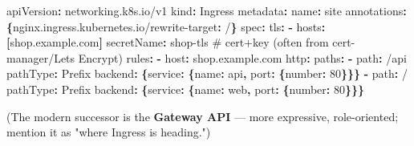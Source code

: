 \documentclass[11pt]{article}
\newenvironment{Shaded}{\begin{snugshade}}{\end{snugshade}}
\newcommand{\AttributeTok}[1]{\textcolor[rgb]{0.16,0.50,0.73}{#1}}
\newcommand{\CommentTok}[1]{\textcolor[rgb]{0.48,0.49,0.49}{#1}}
\newcommand{\DecValTok}[1]{\textcolor[rgb]{0.96,0.45,0.00}{#1}}
\newcommand{\FunctionTok}[1]{\textcolor[rgb]{0.56,0.27,0.68}{#1}}
\newcommand{\KeywordTok}[1]{\textcolor[rgb]{0.81,0.81,0.76}{\textbf{#1}}}
\begin{document}
\begin{Shaded}
\begin{Highlighting}[]
\FunctionTok{apiVersion}\KeywordTok{:}\AttributeTok{ networking.k8s.io/v1}
\FunctionTok{kind}\KeywordTok{:}\AttributeTok{ Ingress}
\FunctionTok{metadata}\KeywordTok{:}
\AttributeTok{  }\FunctionTok{name}\KeywordTok{:}\AttributeTok{ site}
\AttributeTok{  }\FunctionTok{annotations}\KeywordTok{:}\AttributeTok{ }\KeywordTok{\{}\FunctionTok{nginx.ingress.kubernetes.io/rewrite{-}target}\KeywordTok{:}\AttributeTok{ /}\KeywordTok{\}}
\FunctionTok{spec}\KeywordTok{:}
\AttributeTok{  }\FunctionTok{tls}\KeywordTok{:}
\AttributeTok{    }\KeywordTok{{-}}\AttributeTok{ }\FunctionTok{hosts}\KeywordTok{:}\AttributeTok{ }\KeywordTok{[}\AttributeTok{shop.example.com}\KeywordTok{]}
\AttributeTok{      }\FunctionTok{secretName}\KeywordTok{:}\AttributeTok{ shop{-}tls}\CommentTok{         \# cert+key (often from cert{-}manager/Let\textquotesingle{}s Encrypt)}
\AttributeTok{  }\FunctionTok{rules}\KeywordTok{:}
\AttributeTok{    }\KeywordTok{{-}}\AttributeTok{ }\FunctionTok{host}\KeywordTok{:}\AttributeTok{ shop.example.com}
\AttributeTok{      }\FunctionTok{http}\KeywordTok{:}
\AttributeTok{        }\FunctionTok{paths}\KeywordTok{:}
\AttributeTok{          }\KeywordTok{{-}}\AttributeTok{ }\FunctionTok{path}\KeywordTok{:}\AttributeTok{ /api}
\AttributeTok{            }\FunctionTok{pathType}\KeywordTok{:}\AttributeTok{ Prefix}
\AttributeTok{            }\FunctionTok{backend}\KeywordTok{:}\AttributeTok{ }\KeywordTok{\{}\FunctionTok{service}\KeywordTok{:}\AttributeTok{ }\KeywordTok{\{}\FunctionTok{name}\KeywordTok{:}\AttributeTok{ api}\KeywordTok{,}\AttributeTok{   }\FunctionTok{port}\KeywordTok{:}\AttributeTok{ }\KeywordTok{\{}\FunctionTok{number}\KeywordTok{:}\AttributeTok{ }\DecValTok{80}\KeywordTok{\}\}\}}
\AttributeTok{          }\KeywordTok{{-}}\AttributeTok{ }\FunctionTok{path}\KeywordTok{:}\AttributeTok{ /}
\AttributeTok{            }\FunctionTok{pathType}\KeywordTok{:}\AttributeTok{ Prefix}
\AttributeTok{            }\FunctionTok{backend}\KeywordTok{:}\AttributeTok{ }\KeywordTok{\{}\FunctionTok{service}\KeywordTok{:}\AttributeTok{ }\KeywordTok{\{}\FunctionTok{name}\KeywordTok{:}\AttributeTok{ web}\KeywordTok{,}\AttributeTok{   }\FunctionTok{port}\KeywordTok{:}\AttributeTok{ }\KeywordTok{\{}\FunctionTok{number}\KeywordTok{:}\AttributeTok{ }\DecValTok{80}\KeywordTok{\}\}\}}
\end{Highlighting}
\end{Shaded}

(The modern successor is the \textbf{Gateway API} --- more expressive, role-oriented; mention it as "where Ingress is heading.")
\end{document}
